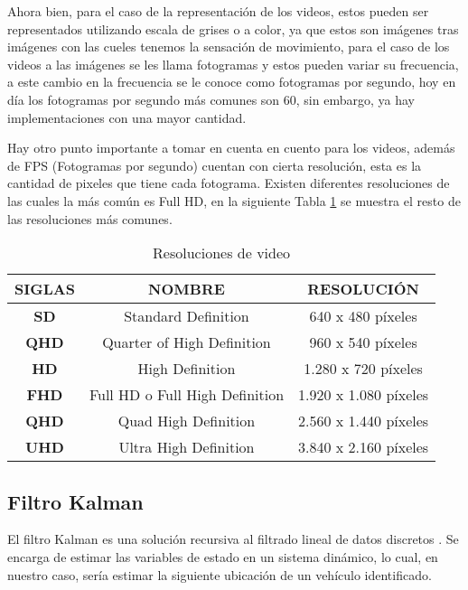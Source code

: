 Ahora bien, para el caso de la representación de los videos, estos pueden ser representados utilizando escala de grises o a color, ya que estos son imágenes tras imágenes con las cueles tenemos la sensación de movimiento, para el caso de los videos a las imágenes se les llama fotogramas y estos pueden variar su frecuencia, a este cambio en la frecuencia se le conoce como fotogramas por segundo, hoy en día los fotogramas por segundo más comunes son 60, sin embargo, ya hay implementaciones con una mayor cantidad.

Hay otro punto importante a tomar en cuenta en cuento para los videos, además de FPS (Fotogramas por segundo) cuentan con cierta resolución, esta es la cantidad de pixeles que tiene cada fotograma. Existen diferentes resoluciones de las cuales la más común es Full HD, en la siguiente Tabla \ref{tab:resolutions} se muestra el resto de las resoluciones más comunes.

\begin{table}[H]
    \caption{Resoluciones de video}
    \label{tab:resolutions}
    \begin{tabular}{|c|c|c|}
    \hline
    \textbf{SIGLAS} & \textbf{NOMBRE} & \textbf{RESOLUCIÓN} \\ \hline
    \textbf{SD}     & Standard Definition & 640 x 480 píxeles \\ \hline
    \textbf{QHD}    & Quarter of High Definition & 960 x 540 píxeles \\ \hline
    \textbf{HD}     & High Definition & 1.280 x 720 píxeles \\ \hline
    \textbf{FHD}    & Full HD o Full High Definition & 1.920 x 1.080 píxeles \\ \hline
    \textbf{QHD}    & Quad High Definition & 2.560 x 1.440 píxeles \\ \hline
    \textbf{UHD}    & Ultra High Definition & 3.840 x 2.160 píxeles \\ \hline
    \end{tabular}
\end{table}

\subsection{Filtro Kalman}

El filtro Kalman es una solución recursiva al filtrado lineal de datos discretos \cite{welch1995introduction}. Se encarga de estimar las variables de estado en un sistema dinámico, lo cual, en nuestro caso, sería estimar la siguiente ubicación de un vehículo identificado.

